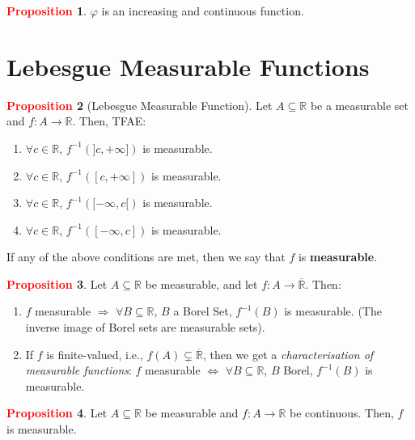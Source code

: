 \documentclass[11pt]{article}
\theoremstyle{definition}
\newtheorem{question}{Question}
\newcommand{\bb}[1]{\mathbb{#1}}
\theoremstyle{definition}
\newtheorem{prop}{\textcolor{red}{Proposition}}
\theoremstyle{remark}
\begin{document}
\begin{prop}
	$\varphi$ is an increasing and continuous function. 
\end{prop}

\section{Lebesgue Measurable Functions}

\begin{prop}[Lebesgue Measurable Function]
	Let $A \subseteq \bb{R}$ be a measurable set and $f: A \rightarrow \bb{R}$. Then, TFAE: 
	\begin{enumerate}[nolistsep]
		\item $\forall c \in \bb{R}$, $f^{-1} (]c, + \infty])$ is measurable. 
		\item $\forall c \in \bb{R}$, $f^{-1} ([c, + \infty])$ is measurable.
		\item $\forall c \in \bb{R}$, $f^{-1} ([-\infty, c[)$ is measurable.
		\item $\forall c \in \bb{R}$, $f^{-1} ([-\infty, c])$ is measurable.
	\end{enumerate}
	If any of the above conditions are met, then we say that $f$ is \textbf{measurable}. 
\end{prop}

\begin{prop}
	Let $A \subseteq \bb{R}$ be measurable, and let $f: A \rightarrow \overline{\bb{R}}$. Then: 
	\begin{enumerate}
		\item $f$ measurable $\Rightarrow$ $\forall B \subseteq \bb{R}$, $B$ a Borel Set, $f^{-1}(B)$ is measurable. (The inverse image of Borel sets are measurable sets).
		\item If $f$ is finite-valued, i.e., $f(A) \subsetneq \overline{\bb{R}}$, then we get a \emph{characterisation of measurable functions}: $f$ measurable $\iff$ $\forall B \subseteq \bb{R}$, $B$ Borel, $f^{-1}(B)$ is measurable. 
	\end{enumerate}
\end{prop}

\begin{prop}
	Let $A \subseteq \bb{R}$ be measurable and $f: A \rightarrow \bb{R}$ be continuous. Then, $f$ is measurable. 
\end{prop}

\end{document}
